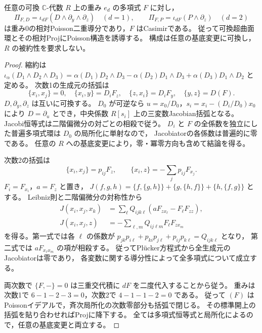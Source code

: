 \begin{lemma}
\label{lem:shadow-jacobian-poisson}
任意の可換 $\mathbb C$-代数 $R$ 上の重み $e_d$ の多項式 $F$ に対し，
\begin{equation}\label{eq:poisson-shadow-bivectors}
 \Pi_{F,D}=\iota_{dF}(D\wedge\partial_y\wedge\partial_z)
 \quad(d=1),\qquad
 \Pi_{F,P}=\iota_{dF}(P\wedge\partial_z)\quad(d=2)
\end{equation}
は重み0の相対Poisson二重導分であり，$F$ はCasimirである。
従って可換超曲面環とその相対ProjにPoisson構造を誘導する。
構成は任意の基底変更に可換し，$R$ の被約性を要求しない。
\end{lemma}
\begin{proof}
縮約は
$\iota_\alpha(D_1\wedge D_2\wedge D_3)
=\alpha(D_1)D_2\wedge D_3-\alpha(D_2)D_1\wedge D_3
+\alpha(D_3)D_1\wedge D_2$ と定める。
次数1の生成元の括弧は
\begin{equation}\label{eq:degree-one-poisson-shadow-brackets}
 \{x_i,x_j\}=0,\quad \{x_i,y\}=D_iF_z,\quad
 \{z,x_i\}=D_iF_y,\quad \{y,z\}=D(F).
\end{equation}
$D,\partial_y,\partial_z$ は互いに可換する。
$D_0$ が可逆なら $u=x_0/D_0$，$s_i=x_i-(D_i/D_0)x_0$ により
$D=\partial_u$ とでき，中央係数 $R[s_i]$ 上の三変数Jacobian括弧となる。
Jacobi恒等式は二階偏微分の対ごとの相殺で従う。
$D_i$ と $F$ の全係数を独立にした普遍多項式環は $D_0$ の局所化に単射なので，
Jacobiatorの各係数は普遍的に零である。
任意の $R$ への基底変更により，零・冪零方向も含めて結論を得る。

次数2の括弧は
\begin{equation}\label{eq:degree-two-poisson-shadow-brackets}
 \{x_i,x_j\}=p_{ij}F_z,\qquad
 \{x_i,z\}=-\sum_jp_{ij}F_{x_j}.
\end{equation}
$F_i=F_{x_i}$，$a=F_z$ と置き，
$J(f,g,h)=\{f,\{g,h\}\}+\{g,\{h,f\}\}+\{h,\{f,g\}\}$ とする。
Leibniz則と二階偏微分の対称性から
\begin{align}
 J(x_i,x_j,x_k)&=\sum_\ell Q_{ijk\ell}
       (aF_{zx_\ell}-F_\ell F_{zz}),
       \label{eq:poisson-shadow-jacobi-xxx}\\
 J(x_i,x_j,z)&=-\sum_{\ell,m}Q_{ij\ell m}F_\ell F_{zx_m}
       \label{eq:poisson-shadow-jacobi-xxz}
\end{align}
を得る。第一式では各 $\ell$ の係数が
$p_{jk}p_{i\ell}+p_{ki}p_{j\ell}+p_{ij}p_{k\ell}=Q_{ijk\ell}$ となり，
第二式では $aF_{x_\ell x_m}$ の項が相殺する。
従ってPl\"ucker方程式から全生成元のJacobiatorは零であり，
各変数に関する導分性によって全多項式について成立する。

両次数で $\{F,-\}=0$ は三重交代積に $dF$ を二度代入することから従う。
重みは次数1で $6-1-2-3=0$，次数2で $4-1-1-2=0$ である。
従って $(F)$ はPoissonイデアルで，斉次局所化の次数零部分も括弧で閉じる。
その標準開上の括弧を貼り合わせればProjに降下する。
全ては多項式恒等式と局所化によるので，任意の基底変更と両立する。
\end{proof}

